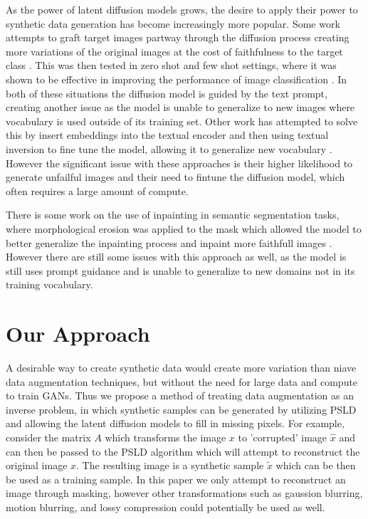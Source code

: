 \documentclass{article}
\begin{document}
As the power of latent diffusion models grows, the desire to apply their power to synthetic data generation has become increasingly more popular. Some work
attempts to graft target images partway through the diffusion process creating more variations of the original images at the cost of faithfulness to the target
class \cite{2108.01073}. This was then tested in zero shot and few shot settings, where it was shown to be effective in improving the performance of image 
classification \cite{2210.07574}. In both of these situations the diffusion model is guided by the text prompt, creating another issue as the model is unable to
generalize to new images where vocabulary is used outside of its training set. Other work has attempted to solve this by insert embeddings into the textual encoder
and then using textual inversion to fine tune the model, allowing it to generalize new vocabulary \cite{2302.07944}. However the significant issue with these approaches
is their higher likelihood to generate unfailful images and their need to fintune the diffusion model, which often requires a large amount of compute.

There is some work on the use of inpainting in semantic segmentation tasks, where morphological erosion was applied to the mask which allowed the model to better
generalize the inpainting process and inpaint more faithfull images \cite{Pobitzer_2023}. However there are still some issues with this approach as well,
as the model is still uses prompt guidance and is unable to generalize to new domains not in its training vocabulary.

\section{Our Approach}

A desirable way to create synthetic data would create more variation than niave data augmentation techniques, but without the need for
large data and compute to train GANs. Thus we propose a method of treating data augmentation as an inverse problem, in which synthetic samples
can be generated by utilizing PSLD and allowing the latent diffusion models to fill in missing pixels. For example, consider the matrix $A$ which
transforms the image $x$ to 'corrupted' image $\hat{x}$ and can then be passed to the PSLD algorithm which will attempt to reconstruct
the original image $x$. The resulting image is a synthetic sample $\tilde{x}$ which can be then be used as a training sample. In this paper we
only attempt to reconstruct an image through masking, however other transformations such as gaussion blurring, motion blurring, and lossy compression
could potentially be used as well.
\end{document}
